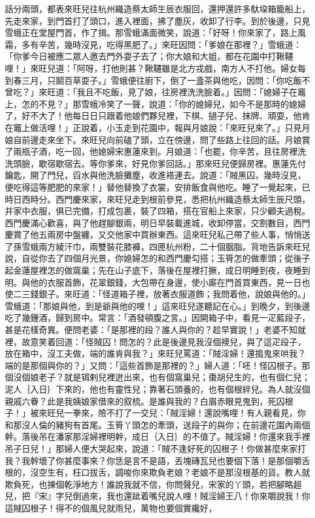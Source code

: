 話分兩頭，都表來旺兒往杭州織造蔡太師生辰衣服回，還押還許多馱垜箱籠船上，先走來家，到門首打了頭口，進入裡面，拂了塵灰，收卸了行李。到於後邊，只見雪蛾正在堂屋門首，作了揖。那雪蛾滿面微笑，說道：「好呀！你來家了，路上風霜，多有辛苦，幾時沒見，吃得黑肥了。」來旺因問：「爹娘在那裡？」雪蛾道：「你爹今日被應二眾人邀去門外耍子去了；你大娘和大姐，都在花園中打鞦韆哩！」來旺兒道：「阿呀，打他則甚？鞦韆雖是北方戎戲，南方人不打他。婦女每到春三月，只鬬百草耍子。」雪蛾便往廚下，倒了一盞茶與他吃，因問：「你吃飯不曾吃？」來旺道：「我且不吃飯，見了娘，往房裡洗洗臉着。」因問：「媳婦子在竈上，怎的不見？」那雪蛾冷笑了一聲，說道：「你的媳婦兒，如今不是那時的媳婦了，好不大了！他每日日只跟着他娘們夥兒裡，下棋、撾子兒、抹牌、頑耍，他肯在竈上做活哩！」正說着，小玉走到花園中，報與月娘說：「來旺兒來了。」只見月娘自前邊走來坐下。來旺兒向前磕了頭，立在傍邊，問了些路上往回的話。月娘賞了兩瓶子酒，吃一回，他媳婦宋惠蓮來到。月娘道：「也罷，你辛苦，且往房裡洗洗頭臉，歇宿歇宿去。等你爹來，好見你爹回話。」那來旺兒便歸房裡。惠蓮先付鑰匙，開了門兒，舀水與他洗臉攤塵，收進褡連去。說道：「賊黑囚，幾時沒見，便吃得這等肥肥的來家！」替他替換了衣裳，安排飯食與他吃。睡了一覺起來，已時日西時分。西門慶來家，來旺兒走到根前參見，悉把杭州織造蔡太師生辰尺頭，并家中衣服，俱已完備，打成包裹，裝了四箱，搭在官船上來家，只少顧夫過稅。西門慶滿心歡喜，與了他趕腳銀兩，明日早裝載進城，收卸停當，交割數目，西門慶賞了他五兩房中盤纏，又交他家中買辦東西。這來旺兒私己帶了些人事，悄悄送了孫雪蛾兩方綾汗巾，兩雙裝花膝褲，四匣杭州粉，二十個胭脂。背地告訴來旺兒說，自從你去了四個月光景，你媳婦怎的和西門慶勾搭；玉筲怎的做牽頭；從後子起金蓮屋裡怎的做窩巢；先在山子底下，落後在屋裡打撅，成日明睡到夜，夜睡到明。與他的衣服首飾，花翠銀錢，大包帶在身邊，使小廝在門首買東西，見一日也使二三錢銀子。來旺道：「怪道箱子裡，放著衣服道飾；我問着他，說娘與他的。」雪蛾道：「那娘與他，到是爺與他的哩！」這來旺兒遂聽記在心。」到晚夕，到後邊吃了幾鍾酒，歸到房中。常言：「酒發頓腹之言。」因開箱子中，看見一疋藍段子，甚是花樣奇異。便問老婆：「是那裡的段？誰人與你的？趁早實說！」老婆不知就裡，故意笑着回道：「怪賊囚！問怎的？此是後邊見我沒個襖兒，與了這疋段子，放在箱中，沒工夫做，端的誰肯與我？」來旺兒罵道：「賊淫婦！還搗鬼來哄我？端的是那個與你的？」又問：「這些首飾是那裡的？」婦人道：「呸！怪囚根子。那個沒個娘老子？就是铒剌兒裡迸出來，也有個窩巢兒；棗胡兒生的，也有個仁兒；泥人｛入日｝下來的，他也有靈性兒；靠著石頭養的，也有個根絆兒。為人就沒個親戚六眷？此是我姨娘家借來的叙梳。是誰與我的？白眉赤眼見鬼到，死囚根子！」被來旺兒一拳來，險不打了一交兒：「賊淫婦！還說嘴哩！有人親看見，你和那沒人倫的豬狗有首尾。玉筲丫頭怎的牽頭，送段子的與你；在前邊花園內兩個幹。落後吊在潘家那淫婦裡明幹，成日｛入日｝的不值了。賊淫婦！你還來我手裡吊子日兒！」那婦人便大哭起來，說道：「賊不逢好死的囚根子！你做甚麼來家打我？我幹壞了你甚麼事來？你恁是言不是語，丟塊磚瓦兒也要個下落！是那個嚼舌根的，沒空生有，枉口拔舌，調唆你來欺負老娘？老娘不是那沒根基的貨。教人就欺負死，也揀個乾淨地方！誰說我就不信，你問聲兒，宋家的丫頭，若把腳略趄兒，把『宋』字兒倒過來，我也還跐着嘴兒說人哩！賊淫婦王八！你來嚼說我！你這賊囚根子！得不的個風兒就雨兒，萬物也要個實纔好，
